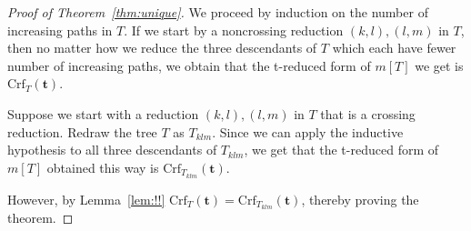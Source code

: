 \documentclass[ALCO,ThmDefs]{cedram}
\numberwithin{equation}{section}
\newcommand*{\Crf}{\mathrm{Crf}}
\newcommand*\+{\smash{\lower2pt\hbox{\rlap{\vrule height14pt}}\raise2pt\hbox{\rlap{\hskip-3pt \vrule height.4pt depth0pt width14.7pt}}}}
\begin{document}
\begin{proof}[Proof of Theorem~\ref{thm:unique}]
We proceed by induction on the number of increasing paths in $T$. If we start by a noncrossing reduction $(k,l), (l,m)$ in $T$, then no matter how we reduce the three descendants of $T$ which each have fewer number of increasing paths, we obtain that the t-reduced form of $m[T]$ we get is $\Crf_T(\mathbf{t})$.

Suppose we start with a reduction $(k,l), (l,m)$ in $T$ that is a crossing reduction. Redraw the tree $T$ as $T_{klm}$. Since we can apply the inductive hypothesis to all three descendants of $T_{klm}$, we get that the t-reduced form of $m[T]$ obtained this way is $\Crf_{T_{klm}}(\mathbf{t})$.

However, by Lemma~\ref{lem:!!} $\Crf_T(\mathbf{t})=\Crf_{T_{klm}}(\mathbf{t})$, thereby proving the theorem.
\end{proof}




\end{document}
